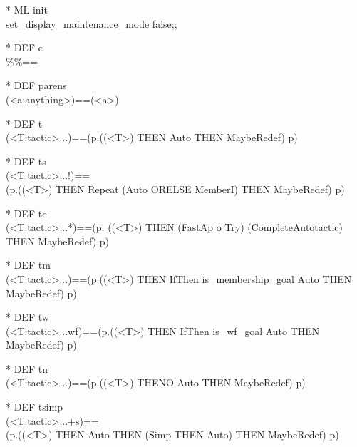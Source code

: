\begin{prl*}
\>* ML init\\
\>  set\_display\_maintenance\_mode false;;
\end{prl*}

\begin{prl*}
\>* DEF c\\
\>  \%<c:comment>\%==
\end{prl*}

\begin{prl*}
\>* DEF parens\\
\>  (<a:anything>)==(<a>)
\end{prl*}

\begin{prl*}
\>* DEF t\\
\>  (<T:tactic>...)==(\mbackslash{}p.((<T>) THEN Auto THEN MaybeRedef) p)
\end{prl*}

\begin{prl*}
\>* DEF ts\\
\>  (<T:tactic>...!)==\\
\>  (\mbackslash{}p.((<T>) THEN Repeat (Auto ORELSE MemberI) THEN MaybeRedef) p)
\end{prl*}

\begin{prl*}
\>* DEF tc\\
\>  (<T:tactic>...*)==(\mbackslash{}p. ((<T>) THEN (FastAp o Try) (CompleteAutotactic) THEN MaybeRedef) p)
\end{prl*}

\begin{prl*}
\>* DEF tm\\
\>  (<T:tactic>...\mepsilon{})==(\mbackslash{}p.((<T>) THEN IfThen is\_membership\_goal Auto THEN MaybeRedef) p)
\end{prl*}

\begin{prl*}
\>* DEF tw\\
\>  (<T:tactic>...wf)==(\mbackslash{}p.((<T>) THEN IfThen is\_wf\_goal Auto THEN MaybeRedef) p)
\end{prl*}

\begin{prl*}
\>* DEF tn\\
\>  (<T:tactic>...\mneg{})==(\mbackslash{}p.((<T>) THENO Auto THEN MaybeRedef) p)
\end{prl*}

\begin{prl*}
\>* DEF tsimp\\
\>  (<T:tactic>...+s)==\\
\>  (\mbackslash{}p.((<T>) THEN Auto THEN (Simp THEN Auto) THEN MaybeRedef) p)
\end{prl*}

